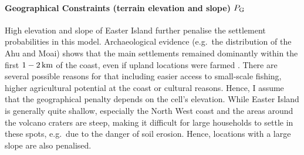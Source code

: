 \paragraph{Geographical Constraints (terrain elevation and slope) $P_{\rm G}$}
High elevation and slope of Easter Island further penalise the settlement probabilities in this model.
Archaeological evidence (e.g.\ the distribution of the Ahu and Moai) shows that the main settlements remained dominantly within the first $1-2\, \rm{km}$ of the coast, even if upland locations were farmed \citep{Bahn2017}.
There are several possible reasons for that including easier access to small-scale fishing, higher agricultural potential at the coast or cultural reasons.
Hence, I assume that the geographical penalty depends on the cell's elevation.
While Easter Island is generally quite shallow, especially the North West coast and the areas around the volcano craters are steep, making it difficult for large households to settle in these spots, e.g.\ due to the danger of soil erosion. 
Hence, locations with a large slope are also penalised.
